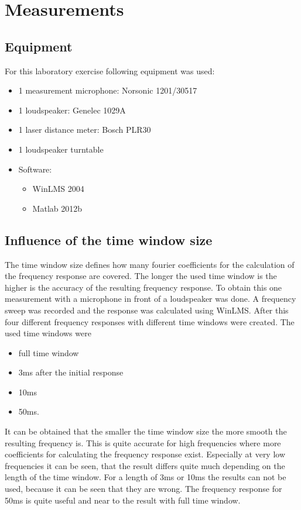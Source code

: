 \documentclass{article}
\begin{document}
\section{Measurements}
\subsection{Equipment}
For this laboratory exercise following equipment was used:
\begin{itemize}
\item 1 measurement microphone: Norsonic 1201/30517
\item 1 loudspeaker: Genelec 1029A
\item 1 laser distance meter: Bosch PLR30
\item 1 loudspeaker turntable
\item Software:
\begin{itemize}
\item WinLMS 2004
\item Matlab 2012b
\end{itemize}
\end{itemize}

\subsection{Influence of the time window size}
The time window size defines how many fourier coefficients for the calculation of the frequency response are covered. The longer the used time window is the higher is the accuracy of the resulting frequency response. To obtain this one measurement with a microphone in front of a loudspeaker was done. A frequency sweep was recorded and the response was calculated using WinLMS. After this four different frequency responses with different time windows were created. The used time windows were 
\begin{itemize}
\item full time window
\item 3ms after the initial response
\item 10ms 
\item 50ms.
\end{itemize}
It can be obtained that the smaller the time window size the more smooth the resulting frequency is. This is quite accurate for high frequencies where more coefficients for calculating the frequency response exist. Especially at very low frequencies it can be seen, that the result differs quite much depending on the length of the time window. For a length of 3ms or 10ms the results can not be used, because it can be seen that they are wrong. The frequency response for 50ms is quite useful and near to the result with full time window.
\end{document}
